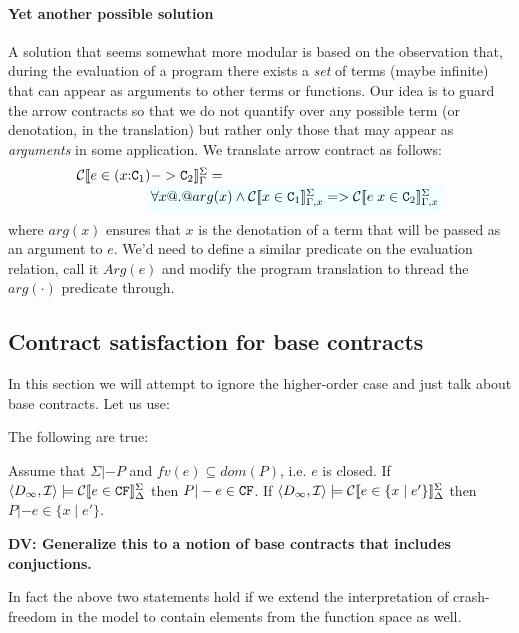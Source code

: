 \documentclass[preprint,nocopyrightspace]{sigplanconf}
\begin{document}
\paragraph{Yet another possible solution}

A solution that seems somewhat more modular is based on the observation that, 
during the evaluation of a program there exists a {\em set} of terms (maybe infinite) that can
appear as arguments to other terms or functions. Our idea is to guard the arrow contracts so that
we do not quantify over any possible term (or denotation, in the translation) but rather only 
those that may appear as {\em arguments} in some application. We translate arrow contract as 
follows:
\[\begin{array}{l}
  \ctrans{\Sigma}{\Gamma}{e \in (x{:}\Ct_1) -> \Ct_2} = \\ 
  \qquad\qquad\quad 
\formula{\forall x @.@ arg(x) \land \ctrans{\Sigma}{\Gamma,x}{x \in \Ct_1} => \ctrans{\Sigma}{\Gamma,x}{e\;x \in \Ct_2}}
\end{array}\] 
where $arg(x)$ ensures that $x$ is the denotation of a term that will be passed as an argument to $e$. We'd need to define
a similar predicate on the evaluation relation, call it $Arg(e)$ and modify the program translation to thread the $arg(\cdot)$
predicate through. 


\subsection{Contract satisfaction for base contracts}\label{sect:cf}

In this section we will attempt to ignore the higher-order case and just talk about 
base contracts. Let us use:

The following are true: 
\begin{lemma}\label{lem:base-contract-adequacy}
Assume that $\Sigma |- P$ and $fv(e) \subseteq dom(P)$, i.e. $e$ is closed.
If $\langle D_\infty,{\cal I}\rangle \models {\cal C}[\![e \in {\tt CF}]\!]_{\Delta}^{\Sigma}$ then $P |- e \in {\tt CF}$. If $\langle D_\infty,{\cal I}\rangle \models {\cal C}[\![e \in \{ x \mid e' \}]\!]_{\Delta}^{\Sigma}$ then $P |- e \in \{x \mid e' \}$.
\end{lemma}
{\bf DV: Generalize this to a notion of base contracts that includes conjuctions.}

In fact the above two statements hold if we extend the interpretation 
of crash-freedom in the model to contain elements from the function 
space as well. 
\end{document}

